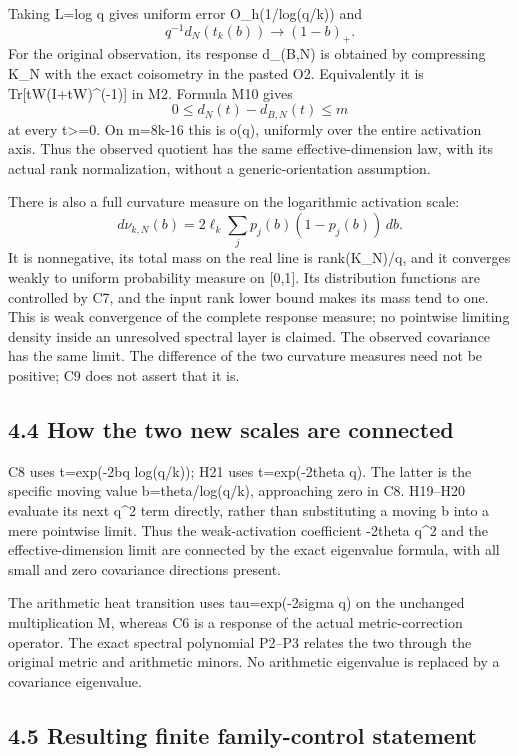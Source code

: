 Taking L=log q gives uniform error O\_h(1/log(q/k)) and \[
 \boxed{q^{-1}d_N(t_k(b))\longrightarrow(1-b)_+.}\tag{C8}
\] For the original observation, its response d\_(B,N) is obtained by compressing K\_N with the exact coisometry in the pasted O2. Equivalently it is Tr{[}tW(I+tW)\^{}(-1){]} in M2. Formula M10 gives \[
 \boxed{0\le d_N(t)-d_{B,N}(t)\le m}\tag{C9}
\] at every t\textgreater=0. On m=8k-16 this is o(q), uniformly over the entire activation axis. Thus the observed quotient has the same effective-dimension law, with its actual rank normalization, without a generic-orientation assumption.

There is also a full curvature measure on the logarithmic activation scale: \[
 d\nu_{k,N}(b)=2\ell_k\sum_jp_j(b)(1-p_j(b))\,db.
 \tag{C10}
\] It is nonnegative, its total mass on the real line is rank(K\_N)/q, and it converges weakly to uniform probability measure on {[}0,1{]}. Its distribution functions are controlled by C7, and the input rank lower bound makes its mass tend to one. This is weak convergence of the complete response measure; no pointwise limiting density inside an unresolved spectral layer is claimed. The observed covariance has the same limit. The difference of the two curvature measures need not be positive; C9 does not assert that it is.

\subsection{4.4 How the two new scales are connected}\label{how-the-two-new-scales-are-connected}

C8 uses t=exp(-2bq log(q/k)); H21 uses t=exp(-2theta q). The latter is the specific moving value b=theta/log(q/k), approaching zero in C8. H19--H20 evaluate its next q\^{}2 term directly, rather than substituting a moving b into a mere pointwise limit. Thus the weak-activation coefficient -2theta q\^{}2 and the effective-dimension limit are connected by the exact eigenvalue formula, with all small and zero covariance directions present.

The arithmetic heat transition uses tau=exp(-2sigma q) on the unchanged multiplication M, whereas C6 is a response of the actual metric-correction operator. The exact spectral polynomial P2--P3 relates the two through the original metric and arithmetic minors. No arithmetic eigenvalue is replaced by a covariance eigenvalue.

\subsection{4.5 Resulting finite family-control statement}\label{resulting-finite-family-control-statement}


